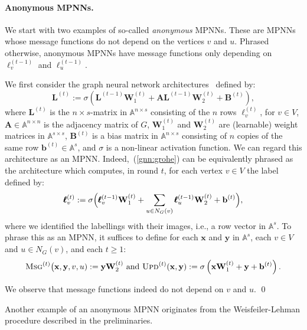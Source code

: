 \paragraph{Anonymous MPNNs.}
We start with two examples of so-called \textit{anonymous}  MPNNs. These are MPNNs whose message functions do not depend on the vertices $v$ and $u$. Phrased otherwise, anonymous MPNNs have message functions only depending on $\pmb{\ell}_v^{(t-1)}$ and $\pmb{\ell}_u^{(t-1)}$.


\begin{example}\label{ex:GNN}
We first consider
the graph neural network
architectures~\cite{hyl17,grohewl} defined by:
\begin{equation}
\mathbf{L}^{(t)}:=\sigma\left(\mathbf{L}^{(t-1)}\mathbf{W}_1^{(t)}+\mathbf{A}\mathbf{L}^{(t-1)}\mathbf{W}_2^{(t)}+\mathbf{B}^{(t)}\right), \label{gnn:grohe}
\end{equation}
where $\mathbf{L}^{(t)}$ is the $n\times s$-matrix in $\mathbb{A}^{n\times s}$ consisting of the $n$ rows $\pmb{\ell}^{(t)}_v$, for $v\in V$, $\mathbf{A}\in\mathbb{A}^{n\times n}$ is the adjacency matrix of $G$, $\mathbf{W}_1^{(t)}$ and $\mathbf{W}_2^{(t)}$ are (learnable) weight matrices in $\mathbb{A}^{s\times s}$,
$\mathbf{B}^{(t)}$ is a bias matrix in $\mathbb{A}^{n\times s}$ consisting of $n$ copies of the same row $\mathbf{b}^{(t)}\in \mathbb{A}^s$, and $\sigma$ is a non-linear activation function. We can regard this architecture as an MPNN. Indeed,~(\ref{gnn:grohe}) can be equivalently phrased as the architecture which computes, in round $t$, for each vertex $v\in V$ the label defined by:
\[
\pmb{\ell}^{(t)}_v:=\sigma\Bigl(\pmb{\ell}^{(t-1)}_v\mathbf{W}_1^{(t)}+ \sum_{u\in N_G(v)}\pmb{\ell}^{(t-1)}_u\mathbf{W}_2^{(t)}+\mathbf{b}^{(t)} \Bigr),
\]
where we identified the labellings with their images, i.e., a row vector in $\mathbb{A}^s$. 
To phrase this as an MPNN, it suffices to define for each $\mathbf{x}$ and $\mathbf{y}$ in $\mathbb{A}^s$, each $v\in V$ and $u\in N_G(v)$, and each $t\geq 1$:
\begin{equation*}
	\textsc{Msg}^{(t)}\bigl(\mathbf{x},\mathbf{y},v,u):=\mathbf{y}\mathbf{W}_2^{(t)}
\text{ and } 
\textsc{Upd}^{(t)}(\mathbf{x},\mathbf{y}):=\sigma\left(\mathbf{x}\mathbf{W}_1^{(t)}+\mathbf{y} + \mathbf{b}^{(t)}\right).
\end{equation*} 

We observe that  message functions indeed do not depend on $v$ and $u$. \qed
\end{example}
Another example of an anonymous MPNN originates from the Weisfeiler-Lehman procedure described in the preliminaries.
